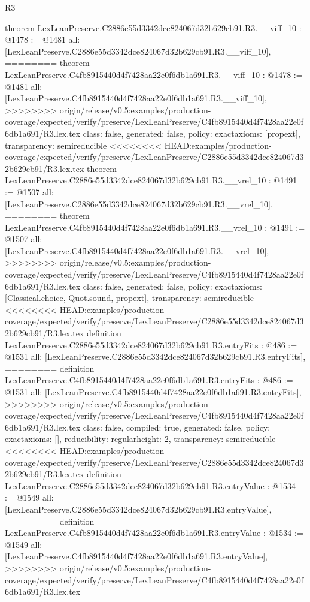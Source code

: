 \begin{lexlean}{R3}
\begin{coremodule}
{{{{{{{theorem LexLeanPreserve.C2886e55d3342dce824067d32b629cb91.R3.__viff_10 : @1478 := @1481 {
  all: [LexLeanPreserve.C2886e55d3342dce824067d32b629cb91.R3.__viff_10],
========
theorem LexLeanPreserve.C4fb8915440d4f7428aa22e0f6db1a691.R3.__viff_10 : @1478 := @1481 {
  all: [LexLeanPreserve.C4fb8915440d4f7428aa22e0f6db1a691.R3.__viff_10],
>>>>>>>> origin/release/v0.5:examples/production-coverage/expected/verify/preserve/LexLeanPreserve/C4fb8915440d4f7428aa22e0f6db1a691/R3.lex.tex
  class: false,
  generated: false,
  policy: exact{axioms: [propext]},
  transparency: semireducible
}
<<<<<<<< HEAD:examples/production-coverage/expected/verify/preserve/LexLeanPreserve/C2886e55d3342dce824067d32b629cb91/R3.lex.tex
theorem LexLeanPreserve.C2886e55d3342dce824067d32b629cb91.R3.__vrel_10 : @1491 := @1507 {
  all: [LexLeanPreserve.C2886e55d3342dce824067d32b629cb91.R3.__vrel_10],
========
theorem LexLeanPreserve.C4fb8915440d4f7428aa22e0f6db1a691.R3.__vrel_10 : @1491 := @1507 {
  all: [LexLeanPreserve.C4fb8915440d4f7428aa22e0f6db1a691.R3.__vrel_10],
>>>>>>>> origin/release/v0.5:examples/production-coverage/expected/verify/preserve/LexLeanPreserve/C4fb8915440d4f7428aa22e0f6db1a691/R3.lex.tex
  class: false,
  generated: false,
  policy: exact{axioms: [Classical.choice, Quot.sound, propext]},
  transparency: semireducible
}
<<<<<<<< HEAD:examples/production-coverage/expected/verify/preserve/LexLeanPreserve/C2886e55d3342dce824067d32b629cb91/R3.lex.tex
definition LexLeanPreserve.C2886e55d3342dce824067d32b629cb91.R3.entryFits : @486 := @1531 {
  all: [LexLeanPreserve.C2886e55d3342dce824067d32b629cb91.R3.entryFits],
========
definition LexLeanPreserve.C4fb8915440d4f7428aa22e0f6db1a691.R3.entryFits : @486 := @1531 {
  all: [LexLeanPreserve.C4fb8915440d4f7428aa22e0f6db1a691.R3.entryFits],
>>>>>>>> origin/release/v0.5:examples/production-coverage/expected/verify/preserve/LexLeanPreserve/C4fb8915440d4f7428aa22e0f6db1a691/R3.lex.tex
  class: false,
  compiled: true,
  generated: false,
  policy: exact{axioms: []},
  reducibility: regular{height: 2},
  transparency: semireducible
}
<<<<<<<< HEAD:examples/production-coverage/expected/verify/preserve/LexLeanPreserve/C2886e55d3342dce824067d32b629cb91/R3.lex.tex
definition LexLeanPreserve.C2886e55d3342dce824067d32b629cb91.R3.entryValue : @1534 := @1549 {
  all: [LexLeanPreserve.C2886e55d3342dce824067d32b629cb91.R3.entryValue],
========
definition LexLeanPreserve.C4fb8915440d4f7428aa22e0f6db1a691.R3.entryValue : @1534 := @1549 {
  all: [LexLeanPreserve.C4fb8915440d4f7428aa22e0f6db1a691.R3.entryValue],
>>>>>>>> origin/release/v0.5:examples/production-coverage/expected/verify/preserve/LexLeanPreserve/C4fb8915440d4f7428aa22e0f6db1a691/R3.lex.tex
}}}}}}}}}}}}
\end{coremodule}
\end{lexlean}
